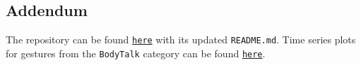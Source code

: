\documentclass{article}
\begin{document}
  \subsection*{Addendum}
  The repository can be found \href{https://github.com/longnguyen1997/nao_animations}{\texttt{here}} with its updated \verb|README.md|.
  Time series plots for gestures from the \verb|BodyTalk| category can be found
  \href{https://github.com/longnguyen1997/nao_animations/tree/master/plots/time_series/standing_bodytalk}{\texttt{here}}.
\end{document}
